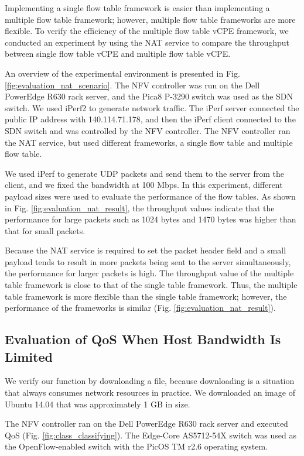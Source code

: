 \documentclass[conference]{IEEEtran}
\begin{document}
Implementing a single flow table framework is easier than implementing a multiple flow table framework; however, multiple flow table frameworks are more flexible. To verify the efficiency of the multiple flow table vCPE framework, we conducted an experiment by using the NAT service to compare the throughput between single flow table vCPE and multiple flow table vCPE.

An overview of the experimental environment is presented in Fig. \ref{fig:evaluation_nat_scenario}. The NFV controller was run on the Dell PowerEdge R630 rack server, and the Pica8 P-3290 switch \cite{pica8-switch} was used as the SDN switch. We used iPerf2 \cite{iperf} to generate network traffic. The iPerf server connected the public IP address with 140.114.71.178, and then the iPerf client connected to the SDN switch and was controlled by the NFV controller. The NFV controller ran the NAT service, but used different frameworks, a single flow table and multiple flow table.

We used iPerf to generate UDP packets and send them to the server from the client, and we fixed the bandwidth at 100 Mbps. In this experiment, different payload sizes were used to evaluate the performance of the flow tables. As shown in Fig. \ref{fig:evaluation_nat_result}, the throughput values indicate that the performance for large packets such as 1024 bytes and 1470 bytes was higher than that for small packets.

Because the NAT service is required to set the packet header field and a small payload tends to result in more packets being sent to the server simultaneously, the performance for larger packets is high. The throughput value of the multiple table framework is close to that of the single table framework. Thus, the multiple table framework is more flexible than the single table framework; however, the performance of the frameworks is similar (Fig. \ref{fig:evaluation_nat_result}).

\subsection{Evaluation of QoS When Host Bandwidth Is Limited}

We verify our function by downloading a file, because downloading is a situation that always consumes network resources in practice. We downloaded an image of Ubuntu 14.04 that was approximately 1 GB in size.


The NFV controller ran on the Dell PowerEdge R630 rack server and executed QoS (Fig. \ref{fig:class_classifying}). The Edge-Core AS5712-54X \cite{edge-core-switch} switch was used as the OpenFlow-enabled switch with the PicOS TM r2.6 operating system.
\end{document}
